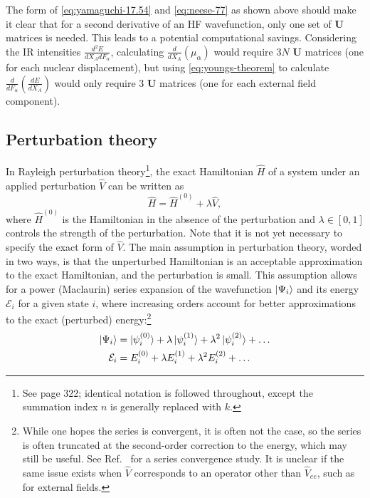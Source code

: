 \documentclass[%
class = book,%
crop = false,%
float = true,%
multi = true,%
preview = false,%
]{standalone}
\begin{document}
The form of \eqref{eq:yamaguchi-17.54} and \eqref{eq:neese-77} as shown above should make it clear that for a second derivative of an HF wavefunction, only one set of \(\mathbf{U}\) matrices is needed. This leads to a potential computational savings. Considering the IR intensities \(\frac{d^{2}E}{dX_{A}dF_{\alpha}}\), calculating \(\frac{d}{d X_{A}} \left(\mu_{\alpha}\right)\) would require \(3N\) \(\mathbf{U}\) matrices (one for each nuclear displacement), but using \eqref{eq:youngs-theorem} to calculate \(\frac{d}{d F_{\alpha}} \left(\frac{d E}{d X_{A}}\right)\) would only require \(3\) \(\mathbf{U}\) matrices (one for each external field component).

\subsection{Perturbation theory}
\label{ssec:perturbation-theory}

In Rayleigh\textendash{}\schrod{} perturbation theory\footnote{See \szabo{}\cite{szabo1989modern} page 322; identical notation is followed throughout, except the summation index \(n\) is generally replaced with \(k\).}, the exact Hamiltonian \(\hat{H}\) of a system under an applied perturbation \(\hat{V}\) can be written as
\begin{equation}
  \label{eq:perturbed-hamiltonian}
  \hat{H} = \hat{H}^{(0)} + \lambda\hat{V},
\end{equation}
where \(\hat{H}^{(0)}\) is the Hamiltonian in the absence of the perturbation and \(\lambda \in [0,1]\) controls the strength of the perturbation. Note that it is not yet necessary to specify the exact form of \(\hat{V}\). The main assumption in perturbation theory, worded in two ways, is that the unperturbed Hamiltonian is an acceptable approximation to the exact Hamiltonian, and the perturbation is small. This assumption allows for a power (Maclaurin) series expansion of the wavefunction \(\ket{\Psi_{i}}\) and its energy \(\mathcal{E}_{i}\) for a given state \(i\), where increasing orders account for better approximations to the exact (perturbed) energy:\footnote{While one hopes the series is convergent, it is often not the case, so the series is often truncated at the second-order correction to the energy, which may still be useful. See Ref.~\parencite{NOBES1987481} for a series convergence study. It is unclear if the same issue exists when \(\hat{V}\) corresponds to an operator other than \(\hat{V}_{ee}\), such as for external fields.}
\begin{align}
  \label{eq:expansion-wavefunction}
  \ket{\Psi_{i}} &= \ket{\psi_{i}^{(0)}} + \lambda\ket{\psi_{i}^{(1)}} + \lambda^{2}\ket{\psi_{i}^{(2)}} + \dots \\
  \label{eq:expansion-energy}
  \mathcal{E}_{i} &= E_{i}^{(0)} + \lambda E_{i}^{(1)} + \lambda^{2} E_{i}^{(2)} + \dots
\end{align}
\end{document}
